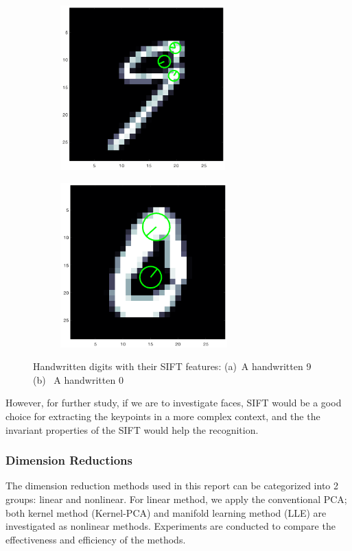 \documentclass[12pt]{article}
\begin{document}
\begin{figure}[tbp]
	\centering
	\begin{subfigure}{.45\textwidth}
		\includegraphics[height = 2.5in]{SIFT}		
		\caption{ }
	\end{subfigure}
	\begin{subfigure}{.45\textwidth}
		\includegraphics[height = 2.5in]{SIFT_2}		
		\caption{ }
	\end{subfigure}
	\caption{Handwritten digits with their SIFT features: (a)~A handwritten 9 (b)~ A handwritten 0}
	\label{fig:SIFT}
\end{figure}


However, for further study, if we are to investigate faces, SIFT would be a good choice for extracting the keypoints in a more complex context, and the the invariant properties of the SIFT would help the recognition.
 
 \subsubsection{Dimension Reductions}
 
The dimension reduction methods used in this report can be categorized into 2 groups: linear and nonlinear. For linear method, we apply the conventional PCA; both kernel method (Kernel-PCA) and manifold learning method (LLE) are investigated as nonlinear methods. Experiments are conducted to compare the effectiveness and efficiency of the methods.
\end{document}
